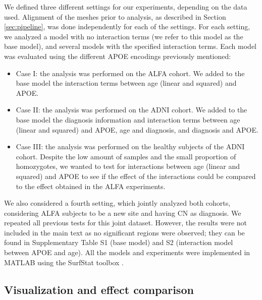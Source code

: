 We defined three different settings for our experiments, depending on the data used. Alignment of the meshes prior to analysis, as described in Section \ref{sec:pipeline}, was done independently for each of the settings. For each setting, we analyzed a model with no interaction terms (we refer to this model as the base model), and several models with the specified interaction terms. Each model was evaluated using the different APOE encodings previously mentioned:

\begin{itemize}
    \item Case I: the analysis was performed on the ALFA cohort. We added to the base model the interaction terms between age (linear and squared) and APOE. 
    \item Case II: the analysis was performed on the ADNI cohort. We added to the base model the diagnosis information and interaction terms between age (linear and squared) and APOE, age and diagnosis, and diagnosis and APOE.
    \item Case III: the analysis was performed on the healthy subjects of the ADNI cohort. Despite the low amount of samples and the small proportion of homozygotes, we wanted to test for interactions between age (linear and squared) and APOE to see if the effect of the interactions could be compared to the effect obtained in the ALFA experiments.
\end{itemize}

We also considered a fourth setting, which jointly analyzed both cohorts, considering ALFA subjects to be a new site and having CN as diagnosis. We repeated all previous tests for this joint dataset. However, the results were not included in the main text as no significant regions were observed; they can be found in Supplementary Table S1 (base model) and S2 (interaction model between APOE and age). All the models and experiments were implemented in MATLAB using the SurfStat toolbox \cite{Worsley2009}.\\ 

\subsection{Visualization and effect comparison}
\label{sec:visualization}

